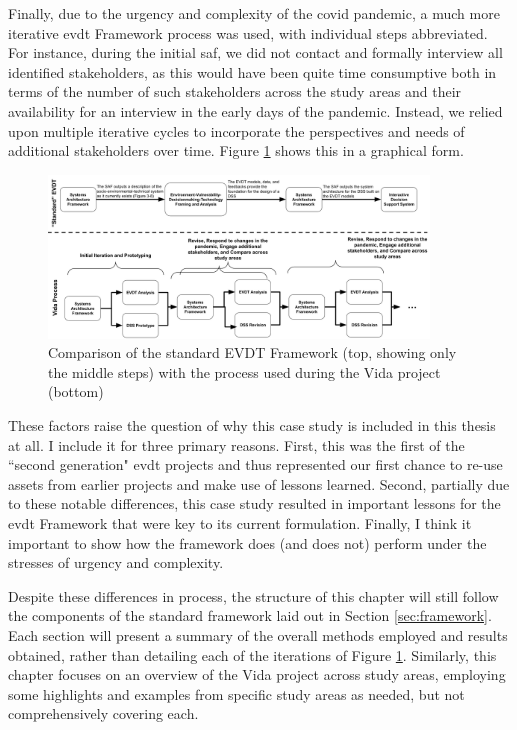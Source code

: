 Finally, due to the urgency and complexity of the \ac{covid} pandemic, a much more iterative \ac{evdt} Framework process was used, with individual steps abbreviated. For instance, during the initial \ac{saf}, we did not contact and formally interview all identified stakeholders, as this would have been quite time consumptive both in terms of the number of such stakeholders across the study areas and their availability for an interview in the early days of the pandemic. Instead, we relied upon multiple iterative cycles to incorporate the perspectives and needs of additional stakeholders over time. Figure \ref{fig:saf-comparison} shows this in a graphical form.

\begin{figure}[!htb]
	\centering
	\includegraphics[width=0.9\textwidth]{Figures/chap5/saf-comparison.png}
	\caption[Comparison of the standard EVDT Framework with the Vida Process]{Comparison of the standard EVDT Framework (top, showing only the middle steps) with the process used during the Vida project (bottom)}
	\label{fig:saf-comparison}
\end{figure}


These factors raise the question of why this case study is included in this thesis at all. I include it for three primary reasons. First, this was the first of the ``second generation" \ac{evdt} projects and thus represented our first chance to re-use assets from earlier projects and make use of lessons learned. Second, partially due to these notable differences, this case study resulted in important lessons for the \ac{evdt} Framework that were key to its current formulation. Finally, I think it important to show how the framework does (and does not) perform under the stresses of urgency and complexity.
	
Despite these differences in process, the structure of this chapter will still follow the components of the standard framework laid out in Section \ref{sec:framework}. Each section will present a summary of the overall methods employed and results obtained, rather than detailing each of the iterations of Figure \ref{fig:saf-comparison}. Similarly, this chapter focuses on an overview of the Vida project across study areas, employing some highlights and examples from specific study areas as needed, but not comprehensively covering each.


